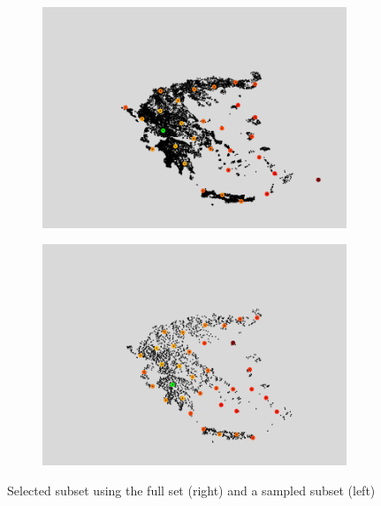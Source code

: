 \begin{figure}[H] 
  \begin{subfigure}[b]{0.5\linewidth}
    \centering
    \includegraphics[width=0.9\linewidth]{Pictures/ls_greece} 
    \label{fig:ls_greece} 
    \vspace{4ex}
  \end{subfigure}%
  \begin{subfigure}[b]{0.5\linewidth}
    \centering
    \includegraphics[width=0.9\linewidth]{Pictures/rs_greece} 
    \label{fig:rs_greece} 
    \vspace{4ex}
  \end{subfigure}
  \caption[Selected subset using the full set and a sampled subset]{Selected subset using the full set (right) and a sampled subset (left)}
  \label{fig:ls_rs_greece} 
\end{figure}

